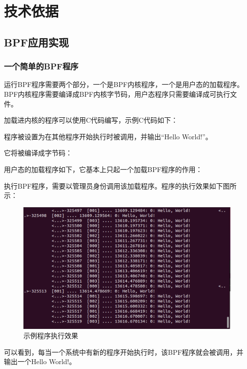 \documentclass[AutoFakeBold,a4paper]{ctexart}
\begin{document}
\section{技术依据}

\subsection{BPF应用实现}

\subsubsection{一个简单的BPF程序}

运行BPF程序需要两个部分，一个是BPF内核程序，一个是用户态的加载程序。
BPF内核程序需要编译成BPF内核字节码，用户态程序只需要编译成可执行文件。\cite{calavera2019linux}

加载进内核的程序可以使用C代码编写，示例C代码如下：



程序被设置为在其他程序开始执行时被调用，并输出“Hello World!”。

它将被编译成字节码：



用户态的加载程序如下，它基本上只起一个加载BPF程序的作用：



执行BPF程序，需要以管理员身份调用该加载程序。程序的执行效果如下图所示：

\begin{figure}[H]
    \centering
    \includegraphics[width=0.7\columnwidth]{../LiangHengyu/hello_world/test1.png}
    \caption{示例程序执行效果}
\end{figure}

可以看到，每当一个系统中有新的程序开始执行时，该BPF程序就会被调用，并输出一个{\ttfamily Hello World!}。
\end{document}
